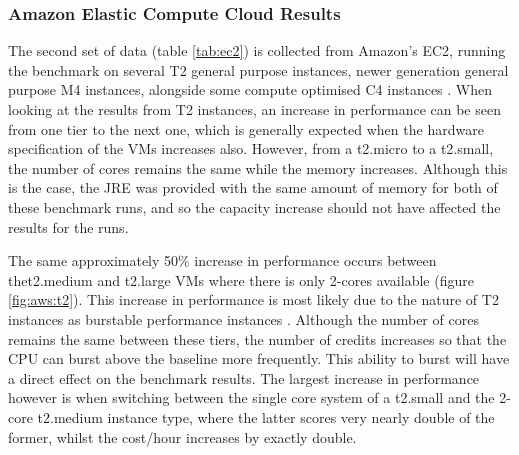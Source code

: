 \documentclass{entcs} \usepackage{entcsmacro}
\begin{document}



\subsubsection{Amazon Elastic Compute Cloud Results}\label{sec:eval:awsresults}

The second set of data (table \ref{tab:ec2}) is collected from Amazon's EC2, running the benchmark on several T2 general purpose instances, newer generation general purpose M4 instances, alongside some compute optimised C4 instances \cite{awsvmtype}. When looking at the results from T2 instances, an increase in performance can be seen from one tier to the next one, which is generally expected when the hardware specification of the VMs increases also. However, from a t2.micro to a t2.small, the number of cores remains the same while the memory increases. Although this is the case, the JRE was provided with the same amount of memory for both of these benchmark runs, and so the capacity increase should not have affected the results for the runs.

The same approximately 50\% increase in performance occurs between the\linebreak t2.medium and t2.large VMs where there is only 2-cores available (figure \ref{fig:aws:t2}). This increase in performance is most likely due to the nature of T2 instances as burstable performance instances \cite{awsvmtype}. Although the number of cores remains the same between these tiers, the number of credits increases so that the CPU can burst above the baseline more frequently. This ability to burst will have a direct effect on the benchmark results. The largest increase in performance however is when switching between the single core system of a t2.small and the 2-core t2.medium instance type, where the latter scores very nearly double of the former, whilst the cost/hour increases by exactly double.
\end{document}
